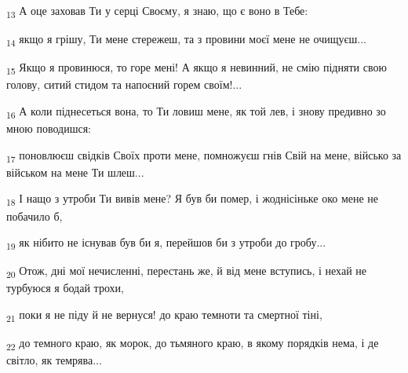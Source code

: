 \begin{tcolorbox}
\textsubscript{13} А оце заховав Ти у серці Своєму, я знаю, що є воно в Тебе:
\end{tcolorbox}
\begin{tcolorbox}
\textsubscript{14} якщо я грішу, Ти мене стережеш, та з провини моєї мене не очищуєш...
\end{tcolorbox}
\begin{tcolorbox}
\textsubscript{15} Якщо я провинюся, то горе мені! А якщо я невинний, не смію підняти свою голову, ситий стидом та напоєний горем своїм!...
\end{tcolorbox}
\begin{tcolorbox}
\textsubscript{16} А коли піднесеться вона, то Ти ловиш мене, як той лев, і знову предивно зо мною поводишся:
\end{tcolorbox}
\begin{tcolorbox}
\textsubscript{17} поновлюєш свідків Своїх проти мене, помножуєш гнів Свій на мене, військо за військом на мене Ти шлеш...
\end{tcolorbox}
\begin{tcolorbox}
\textsubscript{18} І нащо з утроби Ти вивів мене? Я був би помер, і жоднісіньке око мене не побачило б,
\end{tcolorbox}
\begin{tcolorbox}
\textsubscript{19} як нібито не існував був би я, перейшов би з утроби до гробу...
\end{tcolorbox}
\begin{tcolorbox}
\textsubscript{20} Отож, дні мої нечисленні, перестань же, й від мене вступись, і нехай не турбуюся я бодай трохи,
\end{tcolorbox}
\begin{tcolorbox}
\textsubscript{21} поки я не піду й не вернуся! до краю темноти та смертної тіні,
\end{tcolorbox}
\begin{tcolorbox}
\textsubscript{22} до темного краю, як морок, до тьмяного краю, в якому порядків нема, і де світло, як темрява...
\end{tcolorbox}
